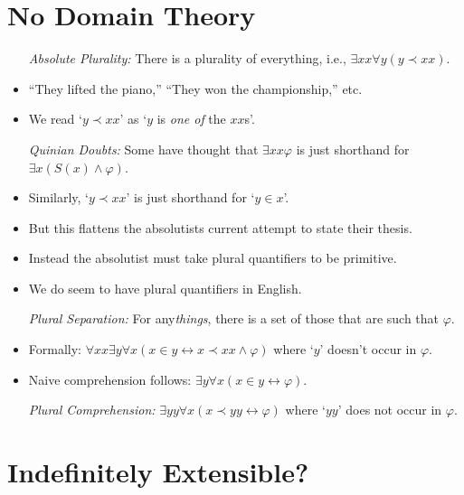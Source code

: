 \documentclass[a4paper, 11pt]{article} %
\begin{document}
\section*{No Domain Theory}

\begin{itemize}
  \item[\it Absolute Plurality:] There is a plurality of everything, i.e., $\exists xx \forall y ( y \prec xx )$.
    \item ``They lifted the piano,'' ``They won the championship,'' etc.
    \item We read `$y \prec xx$' as `$y$ is \textit{one of} the $xx$s'.
  \item[\it Quinian Doubts:] Some have thought that $\exists xx \varphi$ is just shorthand for $\exists x(S(x) \wedge \varphi)$.
    \item Similarly, `$y \prec xx$' is just shorthand for `$y \in x$'.
    \item But this flattens the absolutists current attempt to state their thesis.
    \item Instead the absolutist must take plural quantifiers to be primitive.
    \item We do seem to have plural quantifiers in English.
  \item[\it Plural Separation:] For any\textit{things}, there is a set of those that are such that $\varphi$.
    \item Formally: $\forall xx \exists y \forall x ( x \in y \leftrightarrow x \prec xx \wedge \varphi )$ where `$y$' doesn't occur in $\varphi$.
    \item Naive comprehension follows: $\exists y \forall x ( x \in y \leftrightarrow \varphi)$.
  \item[\it Plural Comprehension:] $\exists yy \forall x ( x \prec yy \leftrightarrow \varphi )$ where `$yy$' does not occur in $\varphi$.
\end{itemize}




\section*{Indefinitely Extensible?}
\end{document}
